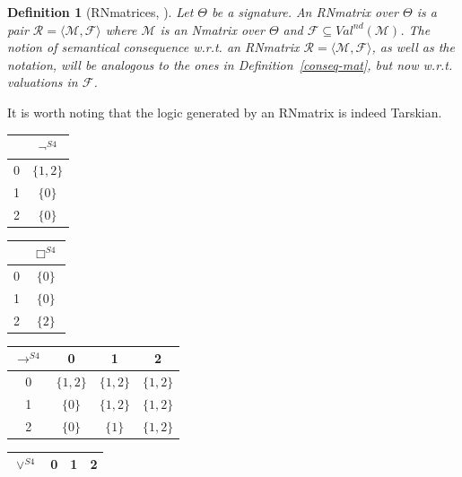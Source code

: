 \documentclass[12pt]{article}
\newtheorem{definition}[theorem]{Definition}
\begin{document}
\begin{definition}[RNmatrices, \cite{coniglio_two_2022}] \label{def:RNmatrix}
    Let $\Theta$ be a signature. An  RNmatrix over $\Theta$ is a pair $\mathcal{R} = \langle \mathcal{M}, \mathcal{F} \rangle$ where $\mathcal{M}$ is an Nmatrix over $\Theta$ and $\mathcal{F} \subseteq Val^{nd}(\mathcal{M})$.  The notion of semantical consequence w.r.t. an RNmatrix $\mathcal{R} = \langle\mathcal{M}, \mathcal{F}\rangle$, as well as the notation, will be analogous to the ones in Definition~\ref{conseq-mat}, but now w.r.t. valuations in $\mathcal{F}$.
\end{definition} 

It is worth noting that the logic generated by an RNmatrix is indeed Tarskian.

\begin{table}
    \centering
    \begin{tabular}{|c|c|}
        \hline
          & $\neg^{S4}$ \\ \hline \hline
        0 & $\{ 1, 2 \}$              \\ \hline
        1 & $\{ 0 \}$                 \\ \hline
        2 & $\{ 0 \}$                 \\ \hline
    \end{tabular}
    \begin{tabular}{|c|c|}
        \hline
          & $\Box^{S4}$ \\ \hline\hline
        0 & $\{ 0 \}$                 \\ \hline
        1 & $\{ 0 \}$                 \\ \hline
        2 & $\{ 2 \}$                 \\ \hline
    \end{tabular}
    \begin{tabular}{|c|c|c|c|}
        \hline
        $\rightarrow^{S4}$ & 0           & 1           & 2           \\ \hline\hline
        0                                & $\{ 1,2 \}$ & $\{ 1,2 \}$ & $\{ 1,2 \}$ \\ \hline
        1                                & $\{ 0 \}$   & $\{ 1,2 \}$ & $\{ 1,2 \}$ \\ \hline
        2                                & $\{ 0 \}$   & $\{ 1 \}$   & $\{ 1,2 \}$ \\ \hline
    \end{tabular}
    \begin{tabular}{|c|c|c|c|}
        \hline
        $\lor^{S4}$ & 0           & 1           & 2           \\ \hline\hline

\end{tabular}
\end{table}
\end{document}
